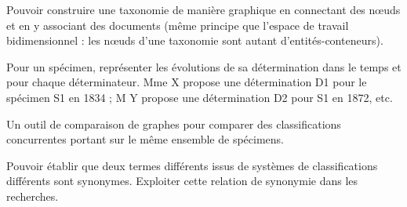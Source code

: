 \startchapter[title={Outils de classification}]

\startTODO
\startitemize
	\item Pouvoir construire une taxonomie de manière graphique en connectant des nœuds et en y associant des documents (même principe que l'espace de travail bidimensionnel : les nœuds d'une taxonomie sont autant d'entités-conteneurs).
	\item Pour un spécimen, représenter les évolutions de sa détermination dans le temps et pour chaque déterminateur. Mme X propose une détermination D1 pour le spécimen S1 en 1834 ; M Y propose une détermination D2 pour S1 en 1872, etc.
	\item Un outil de comparaison de graphes pour comparer des classifications concurrentes portant sur le même ensemble de spécimens.
	\item Pouvoir établir que deux termes différents issus de systèmes de classifications différents sont synonymes. Exploiter cette relation de synonymie dans les recherches.
\stopitemize
\stopTODO